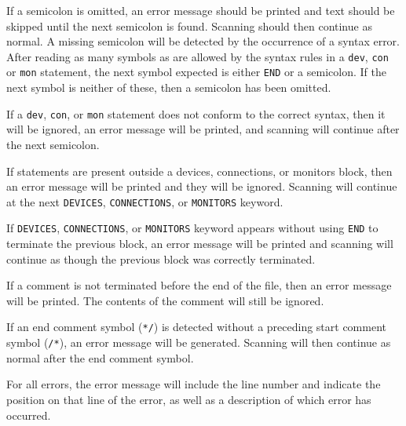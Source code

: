 \documentclass[a4paper,10pt]{article}
\begin{document}
If a semicolon is omitted, an error message should be printed and text should be skipped until the next semicolon is found. Scanning should then continue as normal. A missing semicolon will be detected by the occurrence of a syntax error. After reading as many symbols as are allowed by the syntax rules in a \texttt{dev}, \texttt{con} or \texttt{mon} statement, the next symbol expected is either \texttt{END} or a semicolon. If the next symbol is neither of these, then a semicolon has been omitted. 

If a \texttt{dev}, \texttt{con}, or \texttt{mon} statement does not conform to the correct syntax, then it will be ignored, an error message will be printed, and scanning will continue after the next semicolon. 

If statements are present outside a devices, connections, or monitors block, then an error message will be printed and they will be ignored. Scanning will continue at the next \texttt{DEVICES}, \texttt{CONNECTIONS}, or \texttt{MONITORS} keyword. 

If \texttt{DEVICES}, \texttt{CONNECTIONS}, or \texttt{MONITORS} keyword appears without using \texttt{END} to terminate the previous block, an error message will be printed and scanning will continue as though the previous block was correctly terminated. 

If a comment is not terminated before the end of the file, then an error message will be printed. The contents of the comment will still be ignored.

If an end comment symbol (\texttt{*/}) is detected without a preceding start comment symbol (\texttt{/*}), an error message will be generated. Scanning will then continue as normal after the end comment symbol. 

For all errors, the error message will include the line number and indicate the position on that line of the error, as well as a description of which error has occurred. 

\clearpage
\appendix
\end{document}
